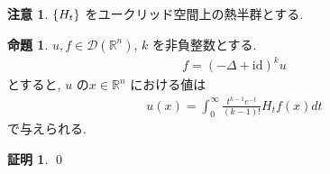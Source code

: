 \documentclass[10pt, fleqn, label-section=none]{bxjsarticle}
\theoremstyle{definition}
\newtheorem{prop}[dfn]{命題}
\newtheorem*{pf*}{証明}
\newtheorem{remark}[dfn]{注意}
\newcommand{\cbra}[1]{\mleft\{#1\mright\}}
\renewcommand{\;}{\, ; \,}
\begin{document}
\begin{remark}
$\cbra{H_t}$ をユークリッド空間上の熱半群とする.
\end{remark}


\begin{prop} $u, f \in \mathcal D (\mathbb R^n) $, $k$ を非負整数とする.  
\begin{align*} f = (-\Delta + \textrm{id} )^k u \end{align*}
とすると, $u$ の$x \in \mathbb R^n$ における値は
\begin{align*} u(x) = \int_0^\infty \frac{t^{k-1} e^{-t} }{(k-1)!} H_t f(x) dt\end{align*}
で与えられる.
\end{prop}
\begin{pf*}

\qed
\end{pf*}
\end{document}
